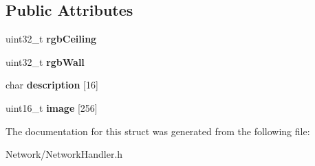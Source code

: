 \subsection*{Public Attributes}
\begin{DoxyCompactItemize}
\item 
uint32\+\_\+t {\bfseries rgb\+Ceiling}\hypertarget{structNetworkHandler_1_1BroadcastMessage_ae41fb3a119ecb6dcc8e0bd7b30bba836}{}\label{structNetworkHandler_1_1BroadcastMessage_ae41fb3a119ecb6dcc8e0bd7b30bba836}

\item 
uint32\+\_\+t {\bfseries rgb\+Wall}\hypertarget{structNetworkHandler_1_1BroadcastMessage_a60dfde06603616556ccda32917408f4e}{}\label{structNetworkHandler_1_1BroadcastMessage_a60dfde06603616556ccda32917408f4e}

\item 
char {\bfseries description} \mbox{[}16\mbox{]}\hypertarget{structNetworkHandler_1_1BroadcastMessage_a759ee3b4d1f21f4f5fd107f943f6b984}{}\label{structNetworkHandler_1_1BroadcastMessage_a759ee3b4d1f21f4f5fd107f943f6b984}

\item 
uint16\+\_\+t {\bfseries image} \mbox{[}256\mbox{]}\hypertarget{structNetworkHandler_1_1BroadcastMessage_a7e3e051c6a20003c7ee62649a80b4dcd}{}\label{structNetworkHandler_1_1BroadcastMessage_a7e3e051c6a20003c7ee62649a80b4dcd}

\end{DoxyCompactItemize}


The documentation for this struct was generated from the following file\+:\begin{DoxyCompactItemize}
\item 
Network/Network\+Handler.\+h\end{DoxyCompactItemize}
